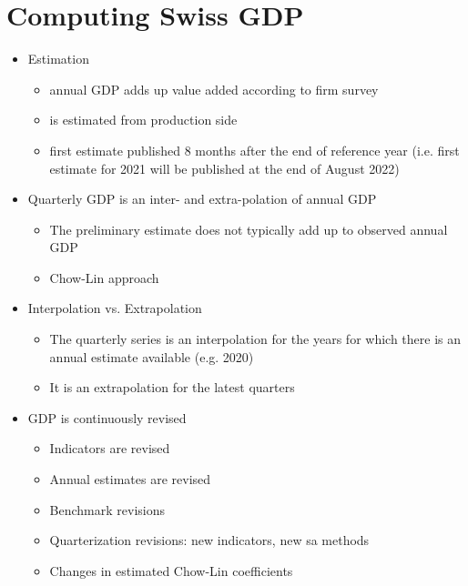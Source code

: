\documentclass[a4paper]{article}
\begin{document}
\section{Computing Swiss GDP}
\begin{itemize}
    \item Estimation
    \begin{itemize}
        \item annual GDP adds up value added according to firm survey
        \item is estimated from production side
        \item first estimate published 8 months after the end of reference year (i.e. first estimate for 2021 will be published at the end of August 2022)
    \end{itemize}
    \item Quarterly GDP is an inter- and extra-polation of annual GDP
    \begin{itemize}
        \item The preliminary estimate does not typically add up to observed annual GDP
        \item Chow-Lin approach
    \end{itemize}
    \item Interpolation vs. Extrapolation
    \begin{itemize}
        \item The quarterly series is an interpolation for the years for which there is an annual estimate available (e.g. 2020)
        \item It is an extrapolation for the latest quarters
    \end{itemize}
    \item GDP is continuously revised
    \begin{itemize}
        \item Indicators are revised
        \item Annual estimates are revised
        \item Benchmark revisions
        \item Quarterization revisions: new indicators, new sa methods
        \item Changes in estimated Chow-Lin coefficients
    \end{itemize}
\end{itemize}
\end{document}
